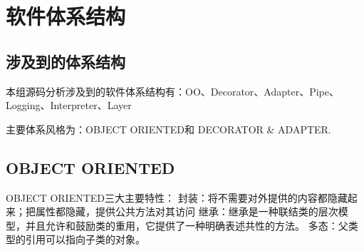 \section{软件体系结构}
\label{sec:sa}
\subsection{涉及到的体系结构}
本组源码分析涉及到的软件体系结构有：OO、Decorator、Adapter、Pipe、Logging、Interpreter、Layer

主要体系风格为：OBJECT ORIENTED和 DECORATOR \& ADAPTER.
\subsection{OBJECT ORIENTED}
OBJECT ORIENTED三大主要特性：
封装：将不需要对外提供的内容都隐藏起来；把属性都隐藏，提供公共方法对其访问
继承：继承是一种联结类的层次模型，并且允许和鼓励类的重用，它提供了一种明确表述共性的方法。
多态：父类型的引用可以指向子类的对象。

